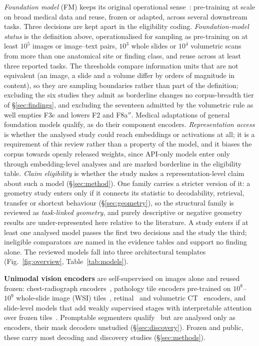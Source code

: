 \emph{Foundation model} (FM) keeps its original operational sense~\cite{bommasani2021opportunities,moor2023generalist}:
pre-training at scale on broad medical data and reuse, frozen or adapted, across several downstream
tasks. Three decisions are kept apart in the eligibility coding. \emph{Foundation-model status} is the
definition above, operationalised for sampling as pre-training on at least $10^{5}$ images or image--text
pairs, $10^{3}$ whole slides or $10^{4}$ volumetric scans from more than one anatomical site or finding
class, and reuse across at least three reported tasks. The thresholds compare information units that are
not equivalent (an image, a slide and a volume differ by orders of magnitude in content), so they are
sampling boundaries rather than part of the definition; excluding the six studies they admit as
borderline changes no corpus-breadth tier of \S\ref{sec:findings}, and excluding the seventeen admitted by the volumetric rule as well empties F3c and lowers F2 and F8a$''$. Medical adaptations of general foundation models
qualify, as do their component encoders. \emph{Representation access} is whether the analysed study could
reach embeddings or activations at all; it is a requirement of this review rather than a property of the
model, and it biases the corpus towards openly released weights, since API-only models enter only through
embedding-level analyses and are marked borderline in the eligibility table. \emph{Claim eligibility} is
whether the study makes a representation-level claim about such a model (\S\ref{sec:method}). One family
carries a stricter version of it: a geometry study enters only if it connects its statistic to
decodability, retrieval, transfer or shortcut behaviour (\S\ref{sec:geometry}), so the structural family
is reviewed as \emph{task-linked geometry}, and purely descriptive or negative geometry results are
under-represented here relative to the literature. A study enters if at least one analysed model passes
the first two decisions and the study the third; ineligible comparators are named in the evidence tables
and support no finding alone. The reviewed models fall
into three architectural templates (Fig.~\ref{fig:overview}, Table~\ref{tab:models}).

\textbf{Unimodal vision encoders} are self-supervised on images alone and reused frozen: chest-radiograph
encoders~\cite{sellergren2022simplified,perezgarcia2024scalable}, pathology tile encoders pre-trained on
$10^{8}$--$10^{9}$ whole-slide image (WSI)
tiles~\cite{chen2024generalpurpose,vorontsov2024model,xu2024wholeslide,zimmermann2024virchow2,filiot2024phikon},
retinal~\cite{zhou2023model} and volumetric CT~\cite{blankemeier2024merlin} encoders, and slide-level models
that add weakly supervised stages with interpretable attention over frozen
tiles~\cite{wang2024pathology,ding2024whole}. Promptable segmenters
qualify~\cite{ma2023anything,zhao2024foundation} but are analysed only as encoders, their mask decoders
unstudied (\S\ref{sec:discovery}). Frozen and public, these carry most decoding and discovery studies
(\S\ref{sec:methods}).

